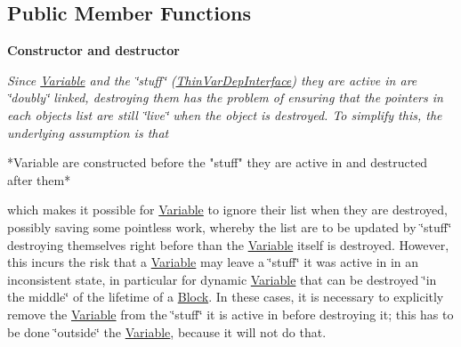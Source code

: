 \subsection*{Public Member Functions}
\begin{Indent}\textbf{ Constructor and destructor}\par
{\em Since \mbox{\hyperlink{class_s_m_spp__di__unipi__it_1_1_variable}{Variable}} and the \char`\"{}stuff\char`\"{} (\mbox{\hyperlink{class_s_m_spp__di__unipi__it_1_1_thin_var_dep_interface}{Thin\+Var\+Dep\+Interface}}) they are active in are \char`\"{}doubly\char`\"{} linked, destroying them has the problem of ensuring that the pointers in each object\textquotesingle{}s list are still \char`\"{}live\char`\"{} when the object is destroyed. To simplify this, the underlying assumption is that \begin{DoxyVerb}*Variable are constructed before the "stuff" they are active
 in and destructed after them*
\end{DoxyVerb}


which makes it possible for \mbox{\hyperlink{class_s_m_spp__di__unipi__it_1_1_variable}{Variable}} to ignore their list when they are destroyed, possibly saving some pointless work, whereby the list are to be updated by \char`\"{}stuff\char`\"{} destroying themselves right before than the \mbox{\hyperlink{class_s_m_spp__di__unipi__it_1_1_variable}{Variable}} itself is destroyed. However, this incurs the risk that a \mbox{\hyperlink{class_s_m_spp__di__unipi__it_1_1_variable}{Variable}} may leave a \char`\"{}stuff\char`\"{} it was active in in an inconsistent state, in particular for dynamic \mbox{\hyperlink{class_s_m_spp__di__unipi__it_1_1_variable}{Variable}} that can be destroyed \char`\"{}in the middle\char`\"{} of the lifetime of a \mbox{\hyperlink{class_s_m_spp__di__unipi__it_1_1_block}{Block}}. In these cases, it is necessary to explicitly remove the \mbox{\hyperlink{class_s_m_spp__di__unipi__it_1_1_variable}{Variable}} from the \char`\"{}stuff\char`\"{} it is active in before destroying it; this has to be done \char`\"{}outside\char`\"{} the \mbox{\hyperlink{class_s_m_spp__di__unipi__it_1_1_variable}{Variable}}, because it will not do that.

}
\end{Indent}
